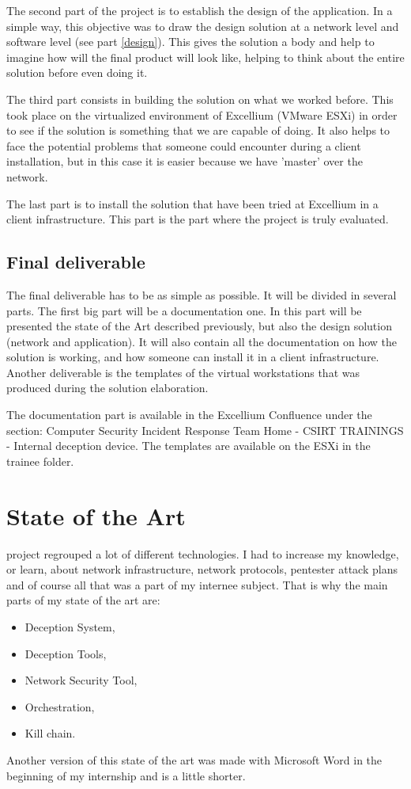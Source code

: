 \documentclass{tnreport}
\begin{document}
The second part of the project is to establish the design of the application. In a simple way, this objective was to draw the design solution at a network level and software level (see part  \ref{design}). This gives the solution a body and help to imagine how will the final product will look like, helping to think about the entire solution before even doing it.

The third part consists in building the solution on what we worked before. This took place on the virtualized environment of \gls{Excellium} (VMware ESXi) in order to see if the solution is something that we are capable of doing. It also helps to face the potential problems that someone could encounter during a client installation, but in this case it is easier because we have 'master' over the network.

The last part is to install the solution that have been tried at \gls{Excellium} in a client infrastructure. This part is the part where the project is truly evaluated. 

\section{Final deliverable}
The final deliverable has to be as simple as possible. It will be divided in several parts. The first big part will be a documentation one. In this part will be presented the state of the Art described previously, but also the design solution (network and application). It will also contain all the documentation on how the solution is working, and how someone can install it in a client infrastructure. Another deliverable is the templates of the virtual workstations that was produced during the solution elaboration.

The documentation part is available in the \gls{Excellium} Confluence under the section:  Computer Security Incident Response Team Home - \gls{CSIRT} TRAININGS - Internal deception device.
The templates are available on the ESXi in the trainee folder.

\chapter{State of the Art}
 project regrouped a lot of different technologies. I had to increase my knowledge, or learn, about network infrastructure, network protocols, pentester attack plans and of course all that was a part of my internee subject. That is why the main parts of my state of the art are: 
\begin{itemize}
    \item Deception System,
    \item Deception Tools,
    \item Network Security Tool,
    \item Orchestration,
    \item Kill chain.
\end{itemize}
Another version of this state of the art was made with Microsoft Word in the beginning of my internship and is a little shorter.
\end{document}
